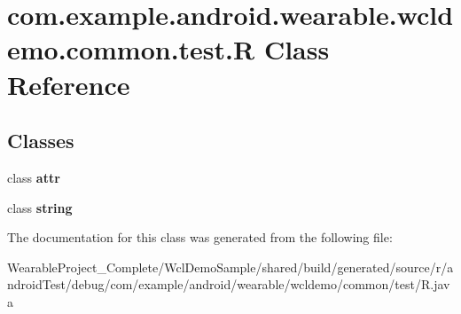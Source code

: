 \hypertarget{classcom_1_1example_1_1android_1_1wearable_1_1wcldemo_1_1common_1_1test_1_1R}{}\section{com.\+example.\+android.\+wearable.\+wcldemo.\+common.\+test.\+R Class Reference}
\label{classcom_1_1example_1_1android_1_1wearable_1_1wcldemo_1_1common_1_1test_1_1R}
\subsection*{Classes}
\begin{DoxyCompactItemize}
\item 
class {\bfseries attr}
\item 
class {\bfseries string}
\end{DoxyCompactItemize}


The documentation for this class was generated from the following file\+:\begin{DoxyCompactItemize}
\item 
Wearable\+Project\+\_\+\+Complete/\+Wcl\+Demo\+Sample/shared/build/generated/source/r/android\+Test/debug/com/example/android/wearable/wcldemo/common/test/R.\+java\end{DoxyCompactItemize}
